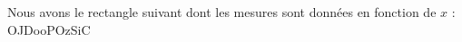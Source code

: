 
\begin{exercice}\label{exosmath-0805}

    Nous avons le rectangle suivant dont les mesures sont données en fonction de \( x\) :
OJDooPOzSiC

\end{exercice}
